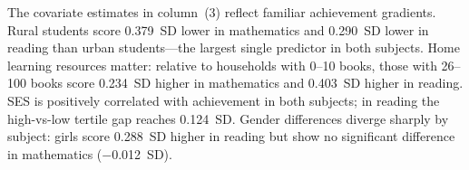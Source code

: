 The covariate estimates in column~(3) reflect familiar achievement gradients.
Rural students score 0.379~SD lower in mathematics and 0.290~SD lower in
reading than urban students---the largest single predictor in both subjects.
Home learning resources matter: relative to households with 0--10 books, those
with 26--100 books score 0.234~SD higher in mathematics and 0.403~SD higher
in reading. SES is positively correlated with achievement in both subjects; in
reading the high-vs-low tertile gap reaches 0.124~SD. Gender differences
diverge sharply by subject: girls score 0.288~SD higher in reading but show no
significant difference in mathematics ($-$0.012~SD).

\begin{table}[htbp]
\centering
\caption{Cross-cohort achievement differences: Mathematics and Reading (2018 vs.\ 2021)}
\label{tab:main}
\end{table}

